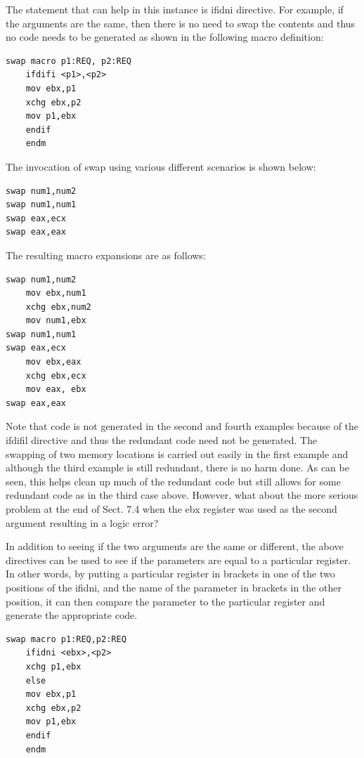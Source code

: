 \documentclass[10pt]{article}
\begin{document}
The statement that can help in this instance is ifidni directive. For example, if the arguments are the same, then there is no need to swap the contents and thus no code needs to be generated as shown in the following macro definition:

\begin{verbatim}
swap macro p1:REQ, p2:REQ
    ifdifi <p1>,<p2>
    mov ebx,p1
    xchg ebx,p2
    mov p1,ebx
    endif
    endm
\end{verbatim}

The invocation of swap using various different scenarios is shown below:

\begin{verbatim}
swap num1,num2
swap num1,num1
swap eax,ecx
swap eax,eax
\end{verbatim}

The resulting macro expansions are as follows:

\begin{verbatim}
swap num1,num2
    mov ebx,num1
    xchg ebx,num2
    mov num1,ebx
swap num1,num1
swap eax,ecx
    mov ebx,eax
    xchg ebx,ecx
    mov eax, ebx
swap eax,eax
\end{verbatim}

Note that code is not generated in the second and fourth examples because of the ifdifil directive and thus the redundant code need not be generated. The swapping of two memory locations is carried out easily in the first example and although the third example is still redundant, there is no harm done. As can be seen, this helps clean up much of the redundant code but still allows for some redundant code as in the third case above. However, what about the more serious problem at the end of Sect. 7.4 when the ebx register was used as the second argument resulting in a logic error?

In addition to seeing if the two arguments are the same or different, the above directives can be used to see if the parameters are equal to a particular register. In other words, by putting a particular register in brackets in one of the two positions of the ifidni, and the name of the parameter in brackets in the other position, it can then compare the parameter to the particular register and generate the appropriate code.

\begin{verbatim}
swap macro p1:REQ,p2:REQ
    ifidni <ebx>,<p2>
    xchg p1,ebx
    else
    mov ebx,p1
    xchg ebx,p2
    mov p1,ebx
    endif
    endm
\end{verbatim}
\end{document}
